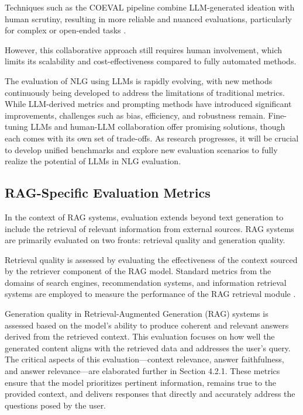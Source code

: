 Techniques such as the COEVAL pipeline combine LLM-generated ideation with human scrutiny, resulting in more reliable and nuanced evaluations, particularly for complex or open-ended tasks \cite{zhang2021human}.

However, this collaborative approach still requires human involvement, which limits its scalability and cost-effectiveness compared to fully automated methods.

The evaluation of NLG using LLMs is rapidly evolving, with new methods continuously being developed to address the limitations of traditional metrics. While LLM-derived metrics and prompting methods have introduced significant improvements, challenges such as bias, efficiency, and robustness remain. Fine-tuning LLMs and human-LLM collaboration offer promising solutions, though each comes with its own set of trade-offs. As research progresses, it will be crucial to develop unified benchmarks and explore new evaluation scenarios to fully realize the potential of LLMs in NLG evaluation.

\subsection{RAG-Specific Evaluation Metrics}

In the context of RAG systems, evaluation extends beyond text generation to include the retrieval of relevant information from external sources. RAG systems are primarily evaluated on two fronts: retrieval quality and generation quality.

Retrieval quality is assessed by evaluating the effectiveness of the context sourced by the retriever component of the RAG model. Standard metrics from the domains of search engines, recommendation systems, and information retrieval systems are employed to measure the performance of the RAG retrieval module \cite{gao2023retrieval}.

Generation quality in Retrieval-Augmented Generation (RAG) systems is assessed based on the model’s ability to produce coherent and relevant answers derived from the retrieved context. This evaluation focuses on how well the generated content aligns with the retrieved data and addresses the user’s query. The critical aspects of this evaluation—context relevance, answer faithfulness, and answer relevance—are elaborated further in Section 4.2.1. These metrics ensure that the model prioritizes pertinent information, remains true to the provided context, and delivers responses that directly and accurately address the questions posed by the user.

